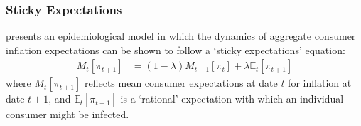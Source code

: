 \subsubsection{Sticky Expectations}



\cite{carroll2003macroeconomic} presents an epidemiological model in which the dynamics of aggregate consumer inflation expectations can be shown to follow a `sticky expectations' equation:
    \begin{align}
        M_{t}[\pi_{t+1}] & = (1-\lambda)M_{t-1}[\pi_{t}]+\lambda \mathbb{E}_{t}[\pi_{t+1}] \label{eq:StickyExp}
    \end{align}
where $M_{t}[\pi_{t+1}]$ reflects mean consumer expectations at date $t$ for inflation at date $t+1$, and $\mathbb{E}_{t}[\pi_{t+1}]$ is a `rational' expectation with which an individual consumer might be infected.



